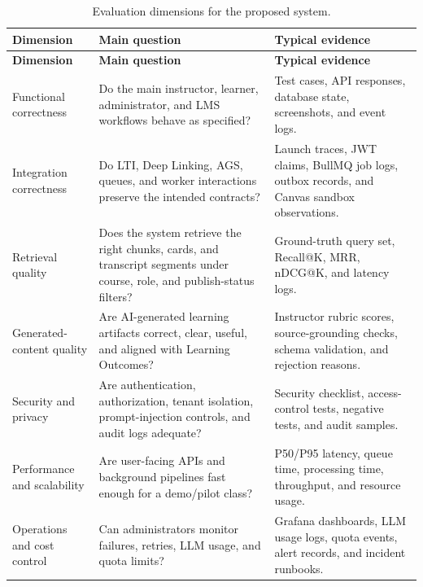\begin{longtable}{|p{3.0cm}|p{5.4cm}|p{5.3cm}|}
    \caption{Evaluation dimensions for the proposed system.}
    \label{tab:evaluation-dimensions} \\
    \hline
    \textbf{Dimension} & \textbf{Main question} & \textbf{Typical evidence} \\
    \hline
    \endfirsthead
    \hline
    \textbf{Dimension} & \textbf{Main question} & \textbf{Typical evidence} \\
    \hline
    \endhead

    Functional correctness
        & Do the main instructor, learner, administrator, and LMS workflows
          behave as specified?
        & Test cases, API responses, database state, screenshots, and event
          logs. \\
    \hline

    Integration correctness
        & Do LTI, Deep Linking, AGS, queues, and worker interactions preserve
          the intended contracts?
        & Launch traces, JWT claims, BullMQ job logs, outbox records, and
          Canvas sandbox observations. \\
    \hline

    Retrieval quality
        & Does the system retrieve the right chunks, cards, and transcript
          segments under course, role, and publish-status filters?
        & Ground-truth query set, Recall@K, MRR, nDCG@K, and latency logs. \\
    \hline

    Generated-content quality
        & Are AI-generated learning artifacts correct, clear, useful, and
          aligned with Learning Outcomes?
        & Instructor rubric scores, source-grounding checks, schema validation,
          and rejection reasons. \\
    \hline

    Security and privacy
        & Are authentication, authorization, tenant isolation, prompt-injection
          controls, and audit logs adequate?
        & Security checklist, access-control tests, negative tests, and audit
          samples. \\
    \hline

    Performance and scalability
        & Are user-facing APIs and background pipelines fast enough for a
          demo/pilot class?
        & P50/P95 latency, queue time, processing time, throughput, and resource
          usage. \\
    \hline

    Operations and cost control
        & Can administrators monitor failures, retries, LLM usage, and quota
          limits?
        & Grafana dashboards, LLM usage logs, quota events, alert records, and
          incident runbooks. \\
    \hline
\end{longtable}


